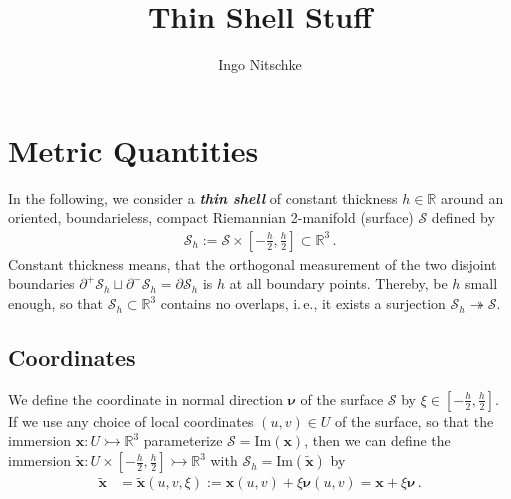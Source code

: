 \documentclass[a4paper,11pt]{scrartcl}
\title{Thin Shell Stuff}
\author{Ingo Nitschke}
\newcommand{\surf}{\mathcal{S}}
\newcommand{\surfh}{\surf_{h}}
\newcommand{\R}{\mathbb{R}}
\renewcommand{\Im}{\text{Im}}
\newcommand{\xb}{\mathbf{x}}
\newcommand{\txb}{\tilde{\xb}}
\newcommand{\nub}{\bm{\nu}}
\newcommand{\formPeriod}{\,\text{.}}
\newcommand{\ie}{i.\,e.}%
\newcommand{\newterm}[1]{\textbf{\textit{#1}}}
\begin{document}
\maketitle
\tableofcontents

\section{Metric Quantities}
In the following, we consider a \newterm{thin shell} of constant thickness \( h\in\R \) around an oriented, boundarieless, compact Riemannian 2-manifold (surface) \( \surf \)
defined by
\begin{align}
 \surfh := \surf\times\left[ -\frac{h}{2}, \frac{h}{2} \right] \subset \R^{3} \formPeriod
\end{align}
Constant thickness means, that the orthogonal measurement of the  two disjoint boundaries \( \partial^{+}\surfh\sqcup\partial^{-}\surfh = \partial\surfh \) is \( h \)
at all boundary points.
Thereby, be \( h \) small enough, so that  \( \surfh\subset \R^{3} \) contains no overlaps,
\ie, it exists a surjection \( \surfh \twoheadrightarrow \surf \).

\subsection{Coordinates}
We define the coordinate in normal direction \( \nub \) of the surface \( \surf \) by \( \xi\in\left[ -\frac{h}{2}, \frac{h}{2} \right] \).
If we use any choice of local coordinates \( (u,v)\in U \) of the surface, so that the immersion 
\( \xb:U \rightarrowtail \R^{3} \) parameterize \( \surf= \Im(\xb)\),
then we can define the immersion \( \txb: U\times\left[ -\frac{h}{2}, \frac{h}{2} \right] \rightarrowtail \R^{3} \) with  \( \surfh= \Im(\txb)\) by
\begin{align}
  \txb &= \txb(u,v,\xi) := \xb(u,v) + \xi\nub(u,v) = \xb + \xi\nub\formPeriod 
\end{align}
\end{document}
